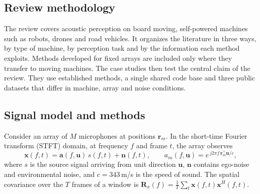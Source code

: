 \documentclass{svproc}
\begin{document}
\subsection{Review methodology}
The review covers acoustic perception on board moving, self-powered machines such as robots, drones and road vehicles.
It organizes the literature in three ways, by type of machine, by perception task and by the information each method exploits.
Methods developed for fixed arrays are included only where they transfer to moving machines.
The case studies then test the central claim of the review.
They use established methods, a single shared code base and three public datasets that differ in machine, array and noise conditions.

\subsection{Signal model and methods}
Consider an array of $M$ microphones at positions $\mathbf{r}_m$.
In the short-time Fourier transform (STFT) domain, at frequency $f$ and frame $t$, the array observes
\begin{equation}\label{eq:model}
\mathbf{x}(f,t)=\mathbf{a}(f,\mathbf{u})\,s(f,t)+\mathbf{n}(f,t),\qquad
a_m(f,\mathbf{u})=e^{\,j2\pi f\,\mathbf{r}_m^{\top}\mathbf{u}/c},
\end{equation}
where $s$ is the source signal arriving from unit direction $\mathbf{u}$, $\mathbf{n}$ contains ego-noise and environmental noise, and $c=343$\,m/s is the speed of sound.
The spatial covariance over the $T$ frames of a window is $\mathbf{R}_x(f)=\frac{1}{T}\sum_t\mathbf{x}(f,t)\mathbf{x}^{H}(f,t)$.
\end{document}
